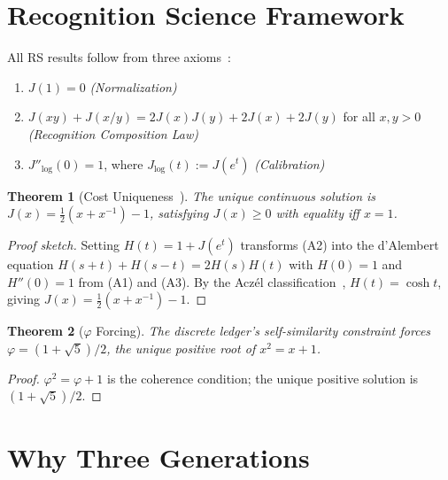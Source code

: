 \documentclass[12pt,a4paper]{article}
\newtheorem{theorem}{Theorem}[section]
\theoremstyle{definition}
\theoremstyle{remark}
\begin{document}
\section{Recognition Science Framework}
\label{sec:framework}

All RS results follow from three axioms~\cite{RS_Axioms}:
\begin{enumerate}[label=(A\arabic*),nosep]
  \item $J(1) = 0$ \hfill\textit{(Normalization)}
  \item $J(xy) + J(x/y) = 2J(x)J(y) + 2J(x) + 2J(y)$ for all $x, y > 0$
  \hfill\textit{(Recognition Composition Law)}
  \item $J''_{\log}(0) = 1$, where $J_{\log}(t) := J(e^t)$
  \hfill\textit{(Calibration)}
\end{enumerate}

\begin{theorem}[Cost Uniqueness~\cite{RS_Axioms}]
\label{thm:J}
The unique continuous solution is $J(x) = \tfrac{1}{2}(x + x^{-1}) - 1$,
satisfying $J(x) \geq 0$ with equality iff $x = 1$.
\end{theorem}

\begin{proof}[Proof sketch]
Setting $H(t) = 1 + J(e^t)$ transforms (A2) into the d'Alembert equation
$H(s+t)+H(s-t) = 2H(s)H(t)$ with $H(0)=1$ and $H''(0)=1$ from
(A1) and (A3).  By the Acz\'el classification~\cite{Aczel1966},
$H(t) = \cosh t$, giving $J(x) = \tfrac{1}{2}(x+x^{-1})-1$.
\end{proof}

\begin{theorem}[$\varphi$ Forcing]
\label{thm:phi}
The discrete ledger's self-similarity constraint forces $\varphi = (1+\sqrt{5})/2$,
the unique positive root of $x^2 = x + 1$.
\end{theorem}

\begin{proof}
$\varphi^2 = \varphi + 1$ is the coherence condition; the unique positive
solution is $(1+\sqrt{5})/2$.
\end{proof}

\section{Why Three Generations}
\label{sec:why-three}
\end{document}
